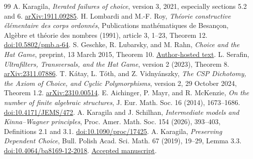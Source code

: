 \documentclass[11pt,a4paper]{article}
\theoremstyle{definition}\newtheorem{definition}[theorem]{Definition}
\theoremstyle{remark}\newtheorem{remark}[theorem]{Remark}
\begin{document}
\begin{thebibliography}{99}
 A. Karagila, \emph{Iterated failures of choice}, version 3, 2021, especially sections 5.2 and 6. \href{https://arxiv.org/abs/1911.09285}{arXiv:1911.09285}.
 H. Lombardi and M.-F. Roy, \emph{Th\'eorie constructive \'el\'ementaire des corps ordonn\'es}, Publications math\'ematiques de Besan\c{c}on, Alg\`ebre et th\'eorie des nombres (1991), article 3, 1--23, Theorem 12. \href{https://doi.org/10.5802/pmb.a-64}{doi:10.5802/pmb.a-64}.
 S. Geschke, R. Lubarsky, and M. Rahn, \emph{Choice and the Hat Game}, preprint, 13 March 2015, Theorem 10. \href{https://www.math.fau.edu/people/faculty/lubarsky/choice-and-the-hat-game.pdf}{Author-hosted text}.
 L. Serafin, \emph{Ultrafilters, Transversals, and the Hat Game}, version 2 (2023), Theorem 8. \href{https://arxiv.org/abs/2311.07886}{arXiv:2311.07886}.
 T. K\'atay, L. T\'oth, and Z. Vidny\'anszky, \emph{The CSP Dichotomy, the Axiom of Choice, and Cyclic Polymorphisms}, version 2, 29 October 2024, Theorem 1.2. \href{https://arxiv.org/abs/2310.00514}{arXiv:2310.00514}.
 E. Aichinger, P. Mayr, and R. McKenzie, \emph{On the number of finite algebraic structures}, J. Eur. Math. Soc. 16 (2014), 1673--1686. \href{https://doi.org/10.4171/JEMS/472}{doi:10.4171/JEMS/472}.
 A. Karagila and J. Schilhan, \emph{Intermediate models and Kinna--Wagner principles}, Proc. Amer. Math. Soc. 154 (2026), 393--403, Definitions 2.1 and 3.1. \href{https://doi.org/10.1090/proc/17425}{doi:10.1090/proc/17425}.
 A. Karagila, \emph{Preserving Dependent Choice}, Bull. Polish Acad. Sci. Math. 67 (2019), 19--29, Lemma 3.3. \href{https://doi.org/10.4064/ba8169-12-2018}{doi:10.4064/ba8169-12-2018}. \href{https://ueaeprints.uea.ac.uk/69607/1/Accepted_Manuscript.pdf}{Accepted manuscript}.
\end{thebibliography}
\end{document}
